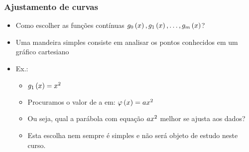 \begin{frame}
\frametitle{Ajustamento de curvas}

\begin{itemize}
  \item Como escolher as funções contínuas $g_0\left(x\right), g_1\left(x\right), \ldots, g_m\left(x\right) $?
  \item Uma mandeira simples consiste em analisar os pontos conhecidos em um gráfico cartesiano
  \item Ex.:
    \begin{multicols}{2}
      \begin{itemize}
        \item $g_1\left(x\right) = x^2$
        \item Procuramos o valor de a em: $\varphi \left(x\right) = ax^2$
        \item Ou seja, qual a parábola com equação $ax^2$ melhor se ajusta aos dados?
        \item<2-> Esta escolha nem sempre é simples e não será objeto de estudo neste curso. 
      \end{itemize}    
      \columnbreak
    \end{multicols}
\end{itemize}

\end{frame}


